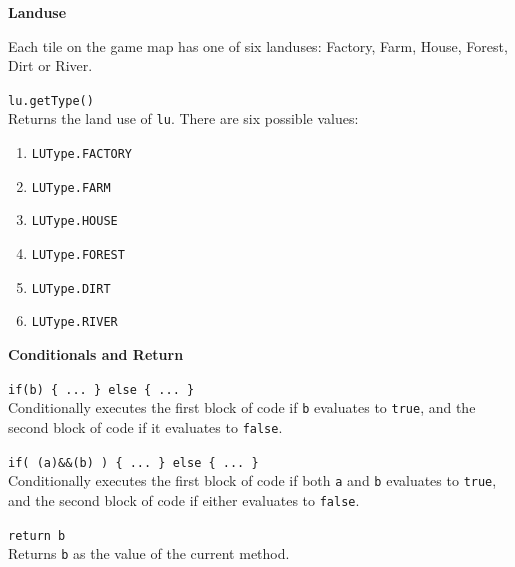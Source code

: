 \documentclass[10pt,twocolumn]{article}
\begin{document}
\noindent\textbf{\large Landuse}
\begin{description}

\item{}
Each tile on the game map has one of six landuses: Factory, Farm, House, Forest, Dirt or River.

\item{\texttt{lu.getType()}}\ \\[.25em]
%
  Returns the land use of \texttt{lu}. There are six possible values:
  \begin{enumerate}
  \item\texttt{LUType.FACTORY}
  \item\texttt{LUType.FARM}
  \item\texttt{LUType.HOUSE}
  \item\texttt{LUType.FOREST}
  \item\texttt{LUType.DIRT}
  \item\texttt{LUType.RIVER}
  \end{enumerate}

\end{description}


\medskip

\noindent\textbf{\large Conditionals and Return}
\begin{description}

\item{\texttt{if(b) \{ ... \} else \{ ... \}}}\ \\[.25em] 
% 
Conditionally executes the first block of code if \texttt{b} evaluates to
\texttt{true}, and the second block of code if it evaluates to \texttt{false}.

\item{\texttt{if( (a)\&\&(b) ) \{ ... \} else \{ ... \}}}\ \\[.25em] 
% 
Conditionally executes the first block of code if both \texttt{a} and \texttt{b} evaluates to
\texttt{true}, and the second block of code if either evaluates to \texttt{false}.

\item{\texttt{return b}} \ \\[.25em]
%
  Returns \texttt{b} as the value of the current method.
\end{description}
\medskip

\medskip

\balance
\end{document}
